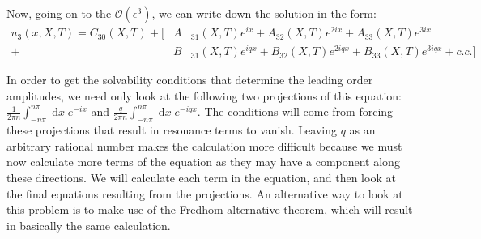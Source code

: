 \documentclass[api,pof,pre,12pt,a4paper]{revtex4-1}
\newcommand{\beqa}{\begin{eqnarray}}
\newcommand{\eeqa}{\end{eqnarray}}
\begin{document}
Now, going on to the $\mathcal{O}(\epsilon^3)$, we can write down the solution in the form:
\beqa
u_3(x,X,T)=C_{30}(X,T)  + \biggl[ &A&_{31}(X,T)e^{i x}+A_{32}(X,T)e^{2 i x}+A_{33}(X,T)e^{3 i x}\\ 
+&B&_{31}(X,T)e^{i q x} + B_{32}(X,T)e^{2 i q x}+B_{33}(X,T)e^{3 i q x} +c.c.\biggr]\nonumber
\label{eq:sol23o3}
\eeqa

In order to get the solvability conditions that determine the leading order amplitudes, we need only look at the following two  projections of this equation:   $\tfrac{1}{2\pi n}\int_{-n\pi}^{n\pi}  \; \text{d}x\; e^{-ix}$ and $\tfrac{q}{2\pi n}\int_{- n\pi}^{n \pi}  \; \text{d}x\; e^{-iqx}$.  The conditions will come from forcing these projections that result in resonance terms to vanish.  Leaving $q$ as an arbitrary rational number makes the calculation more difficult because we must now calculate more terms of the equation as they may have a component along these directions.  We will calculate each term in the equation, and then look at the final equations resulting from the projections.  An alternative way to look at this problem is to make use of the Fredhom alternative theorem, which will result in basically the same calculation.
\end{document}
